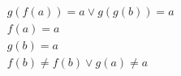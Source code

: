 \begin{align*}
%
& g(f(a)) = a \lor g(g(b)) = a
~\\~
& f(a) = a
~\\~
& g(b) = a
~\\~
& f(b)  \neq  f(b) \lor g(a)  \neq  a
%
\end{align*}
